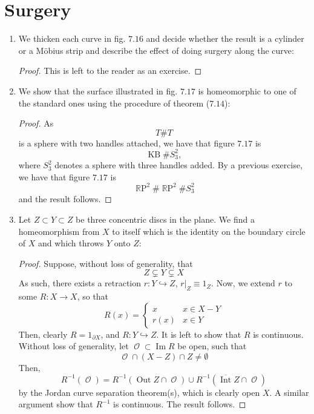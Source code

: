 \documentclass{book}
\DeclareMathOperator*{\R}{\mathbb{R}}
\DeclareMathOperator*{\Int}{\text{Int}}
\DeclareMathOperator*{\Out}{\text{Out}}
\DeclareMathOperator*{\Ocal}{\mathcal{O}}
\DeclareMathOperator*{\Image}{\text{Im}}
\DeclareMathOperator*{\RP}{\R\text{P}}
\DeclareMathOperator*{\KB}{\text{KB}}
\begin{document}
\section{Surgery}
\begin{enumerate}[(1)]
    \item We thicken each curve in fig. $7.16$ and decide whether the result is a cylinder or a M\"obius strip and describe the effect of doing surgery along the curve: 
        \begin{proof} This is left to the reader as an exercise. 
        \end{proof}

    \item We show that the surface illustrated in fig. $7.17$ is homeomorphic to one of the standard ones using the procedure of theorem ($7.14$): 
        \begin{proof} As 
            \[T \# T\]
            is a sphere with two handles attached, we have that figure $7.17$ is 
            \[\KB \# S_3^2,\]
            where $S_3^2$ denotes a sphere with three handles added. By a previous exercise, we have that figure $7.17$ is 
            \[\RP^2 \# \RP^2 \# S_3^2\]
            and the result follows. 

        \end{proof} 

    \item Let $Z \subset Y \subset Z$ be three concentric discs in the plane. We find a homeomorphism from $X$ to itself which is the identity on the boundary circle of $X$ and which throws $Y$ onto $Z$: 
        \begin{proof} Suppose, without loss of generality, that 
            \[Z \subsetneq Y \subsetneq X\]
            As such, there exists a retraction $r: Y \hookrightarrow Z$, $r|_Z \equiv 1_Z$. Now, we extend $r$ to some $R: X \rightarrow X$, so that
            \[ R(x) =     
            \begin{cases}
                x & x \in X - Y \\
                r(x) & x \in Y 
            \end{cases}
            \]
            Then, clearly $R = 1_{\partial X}$, and $R: Y \hookrightarrow Z$. It is left to show that $R$ is continuous. Without loss of generality, let $\Ocal \subset \Image R$ be open, such that 
            \[\Ocal \cap (X - Z) \cap Z \neq \emptyset\]
            Then, 
            \[R^{-1}(\Ocal) = R^{-1}(\Out Z \cap \Ocal) \cup R^{-1}(\overline{\Int} Z \cap \Ocal)\]
            by the Jordan curve separation theorem(s), which is clearly open $X$. A similar argument show that $R^{-1}$ is continuous. The result follows. 
        \end{proof}


\end{enumerate}
\end{document}
